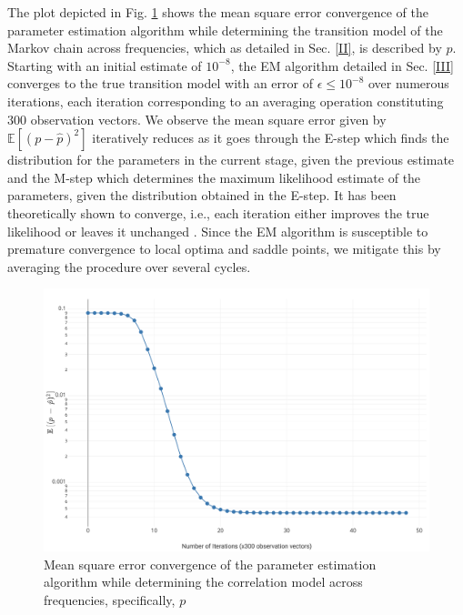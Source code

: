 \documentclass[10pt,twocolumn]{IEEEtran}
\begin{document}
The plot depicted in Fig. \ref{fig:4} shows the mean square error convergence of the parameter estimation algorithm while determining the transition model of the Markov chain across frequencies, which as detailed in Sec. \ref{II}, is described by $p$. Starting with an initial estimate of $10^{-8}$, the EM algorithm detailed in Sec. \ref{III} converges to the true transition model with an error of $\epsilon \leq 10^{-8}$ over numerous iterations, each iteration corresponding to an averaging operation constituting 300 observation vectors. We observe the mean square error given by $\mathbb{E}[(p - \hat{p})^{2}]$ iteratively reduces as it goes through the E-step which finds the distribution for the parameters in the current stage, given the previous estimate and the M-step which determines the maximum likelihood estimate of the parameters, given the distribution obtained in the E-step. It has been theoretically shown to converge, i.e., each iteration either improves the true likelihood or leaves it unchanged \cite{Neal1998}. Since the EM algorithm is susceptible to premature convergence to local optima and saddle points, we mitigate this by averaging the procedure over several cycles.
\begin{figure}
    \centering
    \includegraphics[width=1.0\linewidth]{ParameterEstimatorConvergence.png}
    \caption{Mean square error convergence of the parameter estimation algorithm while determining the correlation model across frequencies, specifically, $p$}
    \label{fig:4}
\end{figure}
\end{document}
